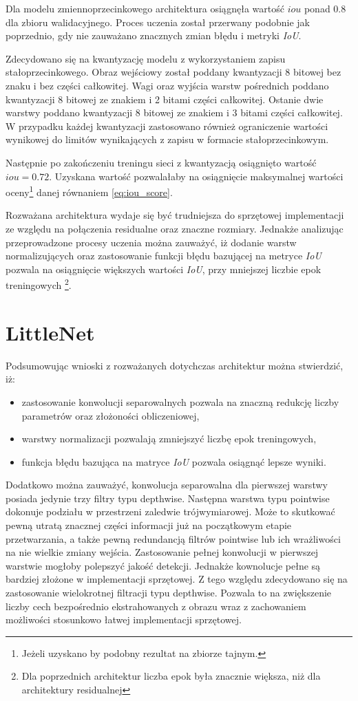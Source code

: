 Dla modelu zmiennoprzecinkowego architektura osiągnęła wartość $iou$ ponad $0.8$ dla zbioru walidacyjnego. Proces uczenia został przerwany podobnie jak poprzednio, gdy nie zauważano znacznych zmian błędu i metryki \emph{IoU}.

Zdecydowano się na kwantyzację modelu z wykorzystaniem zapisu stałoprzecinkowego. 
Obraz wejściowy został poddany kwantyzacji 8 bitowej bez znaku i bez części całkowitej. 
Wagi oraz wyjścia warstw pośrednich poddano kwantyzacji 8 bitowej ze znakiem i 2 bitami części całkowitej.
Ostanie dwie warstwy poddano kwantyzacji 8 bitowej ze znakiem i 3 bitami części całkowitej.
W przypadku każdej kwantyzacji zastosowano również ograniczenie wartości wynikowej do limitów wynikających z zapisu w formacie stałoprzecinkowym.

Następnie po zakończeniu treningu sieci z kwantyzacją osiągnięto wartość $iou = 0.72$.
Uzyskana wartość pozwalałaby na osiągnięcie maksymalnej wartości oceny\footnote{Jeżeli uzyskano by podobny rezultat na zbiorze tajnym.} danej równaniem \eqref{eq:iou_score}. 

Rozważana architektura wydaje się być trudniejsza do sprzętowej implementacji ze względu na połączenia residualne oraz znaczne rozmiary. 
Jednakże analizując przeprowadzone procesy uczenia można zauważyć, iż dodanie warstw normalizujących oraz zastosowanie funkcji błędu bazującej na metryce \emph{IoU} pozwala na osiągnięcie większych wartości \emph{IoU}, przy mniejszej liczbie epok treningowych \footnote{Dla poprzednich architektur liczba epok była znacznie większa, niż dla architektury residualnej}. 


\section{LittleNet}

Podsumowując wnioski z rozważanych dotychczas architektur można stwierdzić, iż:
\begin{itemize}
    \item zastosowanie konwolucji separowalnych pozwala na znaczną redukcję liczby parametrów oraz złożoności obliczeniowej, 
    \item warstwy normalizacji pozwalają zmniejszyć liczbę epok treningowych,
    \item funkcja błędu bazująca na matryce \emph{IoU} pozwala osiągnąć lepsze wyniki.
\end{itemize}

Dodatkowo można zauważyć, konwolucja separowalna dla pierwszej warstwy posiada jedynie trzy filtry typu depthwise.
Następna warstwa typu pointwise dokonuje podziału w przestrzeni zaledwie trójwymiarowej. 
Może to skutkować pewną utratą znacznej części informacji już na początkowym etapie przetwarzania, a także pewną redundancją filtrów pointwise lub ich wrażliwości na nie wielkie zmiany wejścia. 
Zastosowanie pełnej konwolucji w pierwszej warstwie mogłoby polepszyć jakość detekcji.
Jednakże kownolucje pełne są bardziej złożone w implementacji sprzętowej. 
Z tego względu zdecydowano się na zastosowanie wielokrotnej filtracji typu depthwise. 
Pozwala to na zwiększenie liczby cech bezpośrednio ekstrahowanych z obrazu wraz z zachowaniem możliwości stosunkowo łatwej implementacji sprzętowej.


